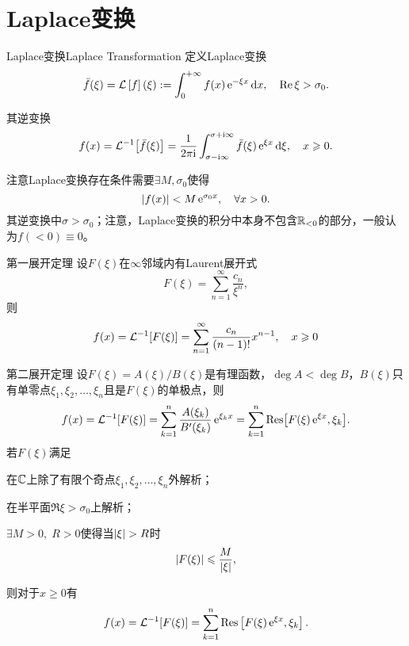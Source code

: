 \section{Laplace变换}
\begin{definition}{Laplace变换}{Laplace Transformation}
	定义Laplace变换
	\[
		\bar f(\xi)=\mathcal L\left[f\right](\xi):=\int_0^{+\infty} f(x)\mathop{}\!\mathrm{e}^{-\xi x}\mathop{}\!\mathrm{d} x,\quad\operatorname{Re}\xi>\sigma_0.
	\]
	
	其逆变换
	\[
		f(x)=\mathcal L^{-1}\!\left[\bar f(\xi)\right]=\frac1{2\pi\mathrm{i}}\int_{\sigma-\mathrm{i}\infty}^{\sigma+\mathrm{i}\infty}\bar f(\xi)\mathop{}\!\mathrm{e}^{\xi x}\mathop{}\!\mathrm{d}\xi,\quad x\geqslant 0.
	\]
\end{definition}
注意Laplace变换存在条件需要$\exists M,\sigma_0$使得
	\[
		\left\lvert f(x)\right\rvert<M\mathop{}\!\mathrm{e}^{\sigma_0x},\quad\forall x>0.
	\]
其逆变换中$\sigma>\sigma_0$；注意，Laplace变换的积分中本身不包含$\mathbb R_{<0}$的部分，一般认为$f(<0)\equiv 0$。
\begin{theorem}{第一展开定理}{}
	设$F(\xi)$在$\infty$邻域内有Laurent展开式
	\[
		F(\xi)=\sum_{n=1}^\infty\frac{c_n}{\xi^n},
	\]
	则
	\[
		f(x)=\mathcal L^{-1}\!\left[F(\xi)\right]=\sum_{n=1}^\infty\frac{c_n}{(n-1)!}x^{n-1},\quad x\geqslant 0
	\]
\end{theorem}
\begin{theorem}{第二展开定理}{}
	设$F(\xi)=A(\xi)/B(\xi)$是有理函数，$\deg A<\deg B$，$B(\xi)$只有单零点$\xi_1,\xi_2,\ldots,\xi_n$且是$F(\xi)$的单极点，则
	\[
		f(x)=\mathcal L^{-1}\!\left[F(\xi)\right]=\sum_{k=1}^n\frac{A(\xi_k)}{B'(\xi_k)}\mathop{}\!\mathrm{e}^{\xi_kx}=\sum_{k=1}^n\operatorname{Res}\bigl[F(\xi)\mathop{}\!\mathrm{e}^{\xi x},\xi_k\bigr].
	\]
\tcblower
	若$F(\xi)$满足
	\begin{compactenum}
		\item 在$\mathbb C$上除了有限个奇点$\xi_1,\xi_2,\ldots,\xi_n$外解析；
		\item 在半平面$\Re\xi>\sigma_0$上解析；
		\item $\exists M>0,\;R>0$使得当$\left\lvert\xi\right\rvert>R$时
		\[
			\left\lvert F(\xi)\right\rvert\leqslant\frac M{\left\lvert\xi\right\rvert},
		\]
	\end{compactenum}
	则对于$x\geqslant 0$有
	\[
		f(x)=\mathcal L^{-1}\!\left[F(\xi)\right]=\sum_{k=1}^n\operatorname{Res}\left[F(\xi)\mathop{}\!\mathrm{e}^{\xi x},\xi_k\right].
	\]
\end{theorem}
